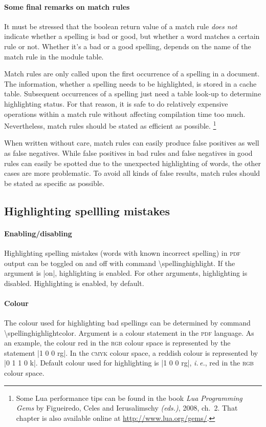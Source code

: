 \documentclass[11pt]{article}
\newcommand*{\acr}[1]{\mbox{\scshape#1}}
\newcommand*{\cmd}[1]{\mbox{\ttfamily\textbackslash#1}}
\newcommand*{\macro}[1]{\cmd{#1}\marginpar{\cmd{#1}}}
\newcommand*{\latinphrase}[1]{\foreignlanguage{latin}{\emph{#1}}}
\newcommand*{\lpie}{\latinphrase{i.\,e.}\xspace}
\begin{document}
\paragraph{Some final remarks on match rules} It must be stressed that
the boolean return value of a match rule \emph{does not} indicate
whether a spelling is bad or good, but whether a word matches a certain
rule or not.  Whether it's a bad or a good spelling, depends on the name
of the match rule in the module table.

Match rules are only called upon the first occurrence of a spelling in a
document.  The information, whether a spelling needs to be highlighted,
is stored in a cache table.  Subsequent occurrences of a spelling just
need a table look-up to determine highlighting status.  For that reason,
it is safe to do relatively expensive operations within a match rule
without affecting compilation time too much.  Nevertheless, match rules
should be stated as efficient as possible.%
\footnote{Some Lua performance tips can be found in the book \emph{Lua
    Programming Gems} by Figueiredo, Celes and Ierusalimschy
  \emph{(eds.)}, 2008, ch.~2.  That chapter is also available online at
  \url{http://www.lua.org/gems/}.}

When written without care, match rules can easily produce false
positives as well as false negatives.  While false positives in bad
rules and false negatives in good rules can easily be spotted due to the
unexpected highlighting of words, the other cases are more problematic.
To avoid all kinds of false results, match rules should be stated as
specific as possible.


\subsection{Highlighting spellling mistakes}
\label{sec:highlight}

\paragraph{Enabling/disabling} Highlighting spelling mistakes (words
with known incorrect spelling) in \acr{pdf} output can be toggled on and
off with command \macro{spellinghighlight}.  If the argument is |on|,
highlighting is enabled.  For other arguments, highlighting is disabled.
Highlighting is enabled, by default.

\paragraph{Colour} The colour used for highlighting bad spellings can be
determined by command \cmd{spellinghighlightcolor}.  Argument is a
colour statement in the \acr{pdf} language.  As an example, the colour
red in the \acr{rgb} colour space is represented by the statement %
|1 0 0 rg|.  In the \acr{cmyk} colour space, a reddish colour is
represented by |0 1 1 0 k|.  Default colour used for highlighting is %
|1 0 0 rg|, \lpie, red in the \acr{rgb} colour space.
\end{document}
